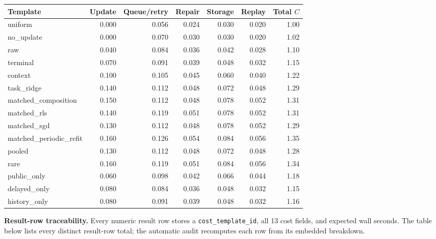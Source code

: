 \documentclass[10pt,a4paper,landscape]{article}
\begin{document}
\begin{center}\scriptsize\begin{tabular}{lrrrrrr}\toprule Template & Update & Queue/retry & Repair & Storage & Replay & Total $C$ \\\midrule
uniform & 0.000 & 0.056 & 0.024 & 0.030 & 0.020 & 1.00 \\

no\_update & 0.000 & 0.070 & 0.030 & 0.030 & 0.020 & 1.02 \\

raw & 0.040 & 0.084 & 0.036 & 0.042 & 0.028 & 1.10 \\

terminal & 0.070 & 0.091 & 0.039 & 0.048 & 0.032 & 1.15 \\

context & 0.100 & 0.105 & 0.045 & 0.060 & 0.040 & 1.22 \\

task\_ridge & 0.140 & 0.112 & 0.048 & 0.072 & 0.048 & 1.29 \\

matched\_composition & 0.150 & 0.112 & 0.048 & 0.078 & 0.052 & 1.31 \\

matched\_rls & 0.140 & 0.119 & 0.051 & 0.078 & 0.052 & 1.31 \\

matched\_sgd & 0.130 & 0.112 & 0.048 & 0.078 & 0.052 & 1.29 \\

matched\_periodic\_refit & 0.160 & 0.126 & 0.054 & 0.084 & 0.056 & 1.35 \\

pooled & 0.130 & 0.112 & 0.048 & 0.072 & 0.048 & 1.28 \\

rare & 0.160 & 0.119 & 0.051 & 0.084 & 0.056 & 1.34 \\

public\_only & 0.060 & 0.098 & 0.042 & 0.066 & 0.044 & 1.18 \\

delayed\_only & 0.080 & 0.084 & 0.036 & 0.048 & 0.032 & 1.15 \\

history\_only & 0.080 & 0.091 & 0.039 & 0.048 & 0.032 & 1.16 \\

\bottomrule\end{tabular}\end{center}
\textbf{Result-row traceability.} Every numeric result row stores a \texttt{cost\_template\_id}, all 13 cost fields, and expected wall seconds. The table below lists every distinct result-row total; the automatic audit recomputes each row from its embedded breakdown.
\end{document}
